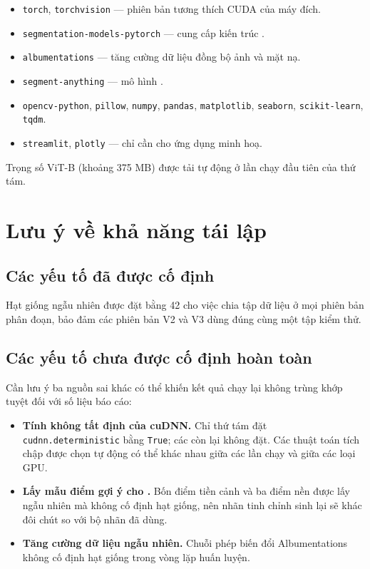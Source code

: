 \begin{itemize}
    \item \texttt{torch}, \texttt{torchvision} --- phiên bản tương thích CUDA của
          máy đích.
    \item \texttt{segmentation-\allowbreak models-\allowbreak pytorch} --- cung cấp kiến trúc \UNetpp{}.
    \item \texttt{albumentations} --- tăng cường dữ liệu đồng bộ ảnh và mặt nạ.
    \item \texttt{segment-\allowbreak anything} --- mô hình \SAM{}.
    \item \texttt{opencv-\allowbreak python}, \texttt{pillow}, \texttt{numpy},
          \texttt{pandas}, \texttt{matplotlib}, \texttt{seaborn},
          \texttt{scikit-learn}, \texttt{tqdm}.
    \item \texttt{streamlit}, \texttt{plotly} --- chỉ cần cho ứng dụng minh hoạ.
\end{itemize}

Trọng số \SAM{} ViT-B (khoảng 375 MB) được tải tự động ở lần chạy đầu tiên của
 thứ tám.

\section{Lưu ý về khả năng tái lập}

\subsection{Các yếu tố đã được cố định}

Hạt giống ngẫu nhiên được đặt bằng 42 cho việc chia tập dữ liệu ở mọi phiên bản
phân đoạn, bảo đảm các phiên bản V2 và V3 dùng đúng cùng một tập kiểm thử.

\subsection{Các yếu tố chưa được cố định hoàn toàn}

Cần lưu ý ba nguồn sai khác có thể khiến kết quả chạy lại không trùng khớp tuyệt
đối với số liệu báo cáo:

\begin{itemize}
    \item \textbf{Tính không tất định của cuDNN.} Chỉ  thứ tám đặt
          \texttt{cudnn.\allowbreak deterministic} bằng \texttt{True}; các  còn
          lại không đặt. Các thuật toán tích chập được chọn tự động có thể khác
          nhau giữa các lần chạy và giữa các loại GPU.
    \item \textbf{Lấy mẫu điểm gợi ý cho \SAM{}.} Bốn điểm tiền cảnh và ba điểm
          nền được lấy ngẫu nhiên mà không cố định hạt giống, nên nhãn tinh chỉnh
          sinh lại sẽ khác đôi chút so với bộ nhãn đã dùng.
    \item \textbf{Tăng cường dữ liệu ngẫu nhiên.} Chuỗi phép biến đổi Albumentations
          không cố định hạt giống trong vòng lặp huấn luyện.
    \end{itemize}

